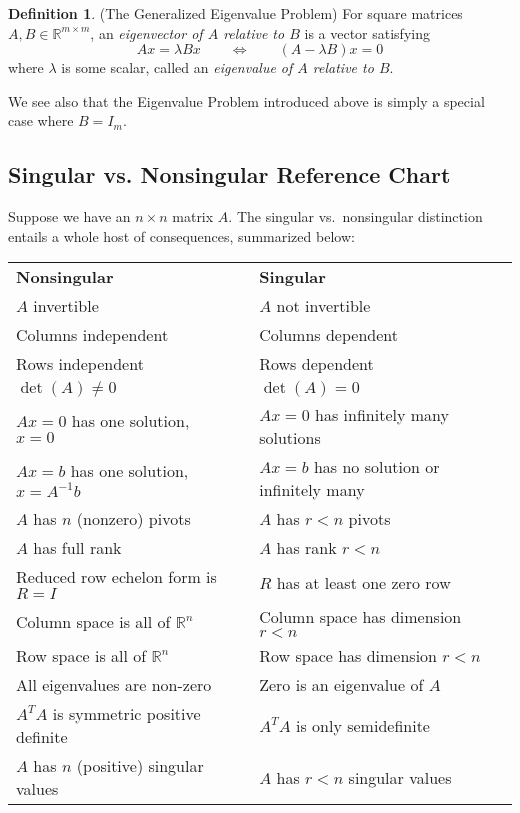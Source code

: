 \documentclass[12pt]{article}
\numberwithin{equation}{section} %
\theoremstyle{plain}
\theoremstyle{definition}
\newtheorem{defn}[thm]{Definition}
\theoremstyle{remark}
\newcommand{\Rmm}{\mathbb{R}^{m\times m}}
\begin{document}

\begin{defn}{(The Generalized Eigenvalue Problem)}
For square matrices $A,B\in\Rmm$, an \emph{eigenvector of $A$ relative
to $B$} is a vector satisfying
\begin{equation}
  Ax = \lambda B x
  \qquad \Leftrightarrow \qquad
  (A - \lambda B) x = 0
\end{equation}
where $\lambda$ is some scalar, called an
\emph{eigenvalue of $A$ relative to $B$}.

We see also that the Eigenvalue Problem introduced above is simply a
special case where $B=I_m$.
\end{defn}

\subsection{Singular vs. Nonsingular Reference Chart}

Suppose we have an $n\times n$ matrix $A$. The singular vs.\ nonsingular
distinction entails a whole host of consequences, summarized below:
\begin{table}[h!]
\centering
\begin{tabular}{lll}
\textbf{Nonsingular}                     && \textbf{Singular} \\
$A$ invertible                           && $A$ not invertible \\
Columns independent                      && Columns dependent \\
Rows independent                         && Rows dependent \\
$\det(A)\neq0$                           && $\det(A)=0$ \\
$Ax = 0$ has one solution, $x = 0$       && $Ax=0$ has infinitely many solutions\\
$Ax = b$ has one solution, $x = A^{-1}b$ && $Ax = b$ has no solution or infinitely many \\
$A$ has $n$ (nonzero) pivots             && $A$ has $r<n$ pivots \\
$A$ has full rank                        && $A$ has rank $r<n$ \\
Reduced row echelon form is $R = I$      && $R$ has at least one zero row \\
Column space is all of $\mathbb{R}^n$    && Column space has dimension $r<n$ \\
Row space is all of $\mathbb{R}^n$       && Row space has dimension $r<n$ \\
All eigenvalues are non-zero             && Zero is an eigenvalue of $A$ \\
$A^T A$ is symmetric positive definite   && $A^T A$ is only semidefinite \\
$A$ has $n$ (positive) singular values   && $A$ has $r<n$ singular values
\end{tabular}
\end{table}
\end{document}
